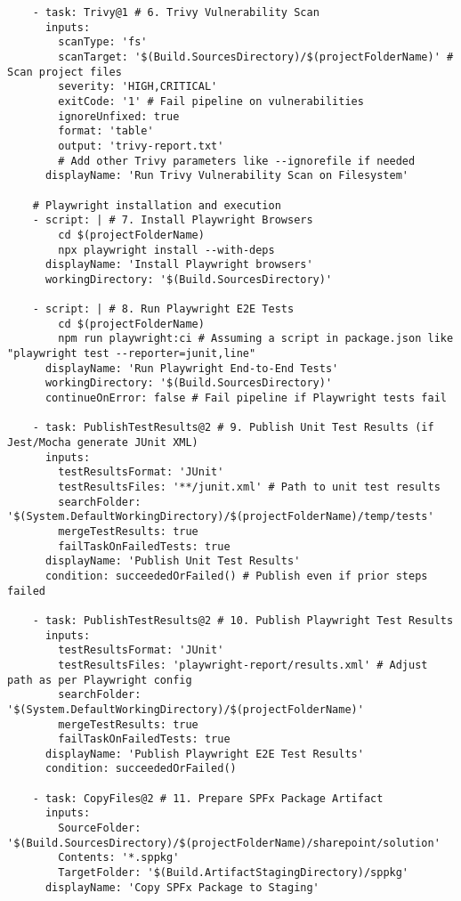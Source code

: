 \begin{verbatim}
    - task: Trivy@1 # 6. Trivy Vulnerability Scan
      inputs:
        scanType: 'fs'
        scanTarget: '$(Build.SourcesDirectory)/$(projectFolderName)' # Scan project files
        severity: 'HIGH,CRITICAL'
        exitCode: '1' # Fail pipeline on vulnerabilities
        ignoreUnfixed: true
        format: 'table'
        output: 'trivy-report.txt'
        # Add other Trivy parameters like --ignorefile if needed
      displayName: 'Run Trivy Vulnerability Scan on Filesystem'

    # Playwright installation and execution
    - script: | # 7. Install Playwright Browsers
        cd $(projectFolderName)
        npx playwright install --with-deps
      displayName: 'Install Playwright browsers'
      workingDirectory: '$(Build.SourcesDirectory)'

    - script: | # 8. Run Playwright E2E Tests
        cd $(projectFolderName)
        npm run playwright:ci # Assuming a script in package.json like "playwright test --reporter=junit,line"
      displayName: 'Run Playwright End-to-End Tests'
      workingDirectory: '$(Build.SourcesDirectory)'
      continueOnError: false # Fail pipeline if Playwright tests fail

    - task: PublishTestResults@2 # 9. Publish Unit Test Results (if Jest/Mocha generate JUnit XML)
      inputs:
        testResultsFormat: 'JUnit'
        testResultsFiles: '**/junit.xml' # Path to unit test results
        searchFolder: '$(System.DefaultWorkingDirectory)/$(projectFolderName)/temp/tests'
        mergeTestResults: true
        failTaskOnFailedTests: true
      displayName: 'Publish Unit Test Results'
      condition: succeededOrFailed() # Publish even if prior steps failed

    - task: PublishTestResults@2 # 10. Publish Playwright Test Results
      inputs:
        testResultsFormat: 'JUnit'
        testResultsFiles: 'playwright-report/results.xml' # Adjust path as per Playwright config
        searchFolder: '$(System.DefaultWorkingDirectory)/$(projectFolderName)'
        mergeTestResults: true
        failTaskOnFailedTests: true
      displayName: 'Publish Playwright E2E Test Results'
      condition: succeededOrFailed()

    - task: CopyFiles@2 # 11. Prepare SPFx Package Artifact
      inputs:
        SourceFolder: '$(Build.SourcesDirectory)/$(projectFolderName)/sharepoint/solution'
        Contents: '*.sppkg'
        TargetFolder: '$(Build.ArtifactStagingDirectory)/sppkg'
      displayName: 'Copy SPFx Package to Staging'


\end{verbatim}
